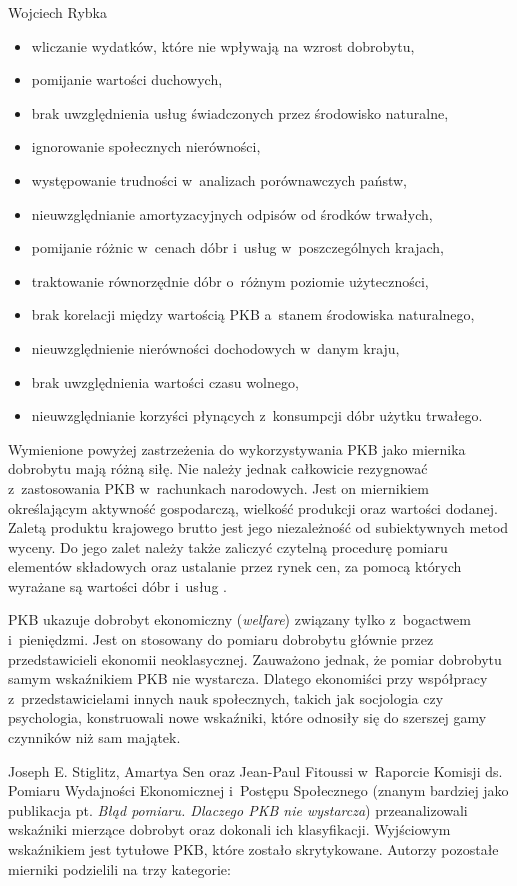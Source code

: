 \begin{artplenv}{Wojciech Rybka}
\begin{itemize}
\item wliczanie wydatków, które nie wpływają na wzrost dobrobytu,
\item pomijanie wartości duchowych,
\item brak uwzględnienia usług świadczonych przez środowisko naturalne,
\item ignorowanie społecznych nierówności,
\item występowanie trudności w~analizach porównawczych państw, 
\item nieuwzględnianie amortyzacyjnych odpisów od środków trwałych, 
\item pomijanie różnic w~cenach dóbr i~usług w~poszczególnych krajach,
\item traktowanie równorzędnie dóbr o~różnym poziomie użyteczności,
\item brak korelacji między wartością PKB a~stanem środowiska naturalnego,
\item nieuwzględnienie nierówności dochodowych w~danym kraju,
\item brak uwzględnienia wartości czasu wolnego,
\item nieuwzględnianie korzyści płynących z~konsumpcji dóbr użytku trwałego.
\end{itemize}

Wymienione powyżej zastrzeżenia do wykorzystywania PKB jako miernika dobrobytu mają różną siłę.
Nie należy jednak całkowicie rezygnować z~zastosowania PKB w~rachunkach narodowych. Jest on miernikiem
określającym aktywność gospodarczą, wielkość produkcji oraz wartości dodanej. Zaletą produktu krajowego brutto jest
jego niezależność od subiektywnych metod wyceny. Do jego zalet należy także zaliczyć czytelną procedurę pomiaru
elementów składowych oraz ustalanie przez rynek cen, za pomocą których wyrażane są wartości dóbr i~usług
\parencite{luszczyk_pomiar_2013}.

PKB ukazuje dobrobyt ekonomiczny (\textit{welfare}) związany tylko z~bogactwem i~pieniędzmi. Jest on stosowany do
pomiaru dobrobytu głównie przez przedstawicieli ekonomii neoklasycznej. Zauważono jednak, że pomiar dobrobytu samym
wskaźnikiem PKB nie wystarcza. Dlatego ekonomiści przy współpracy z~przedstawicielami innych nauk społecznych, takich jak
socjologia czy psychologia, konstruowali nowe wskaźniki, które odnosiły się do szerszej gamy czynników niż sam majątek. 

Joseph E. Stiglitz, Amartya Sen oraz Jean-Paul Fitoussi w~Raporcie Komisji ds. Pomiaru Wydajności Ekonomicznej i~Postępu
Społecznego
\parencite{stiglitz_blad_2013}
(znanym bardziej jako publikacja pt. \textit{Błąd pomiaru.
Dlaczego PKB nie wystarcza}) przeanalizowali wskaźniki mierzące dobrobyt oraz dokonali ich klasyfikacji. Wyjściowym
wskaźnikiem jest tytułowe PKB, które zostało skrytykowane. Autorzy pozostałe mierniki podzielili na trzy kategorie:


\end{artplenv}
